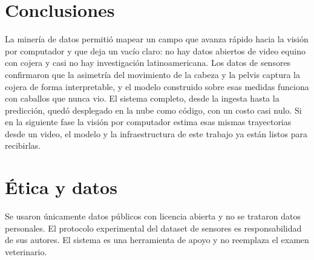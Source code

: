 \documentclass[conference,a4paper]{IEEEtran}
\begin{document}
\section{Conclusiones}
La minería de datos permitió mapear un campo que avanza rápido hacia la visión por computador y que deja un vacío claro: no hay datos abiertos de video equino con cojera y casi no hay investigación latinoamericana. Los datos de sensores confirmaron que la asimetría del movimiento de la cabeza y la pelvis captura la cojera de forma interpretable, y el modelo construido sobre esas medidas funciona con caballos que nunca vio. El sistema completo, desde la ingesta hasta la predicción, quedó desplegado en la nube como código, con un costo casi nulo. Si en la siguiente fase la visión por computador estima esas mismas trayectorias desde un video, el modelo y la infraestructura de este trabajo ya están listos para recibirlas.

\section*{Ética y datos}
Se usaron únicamente datos públicos con licencia abierta y no se trataron datos personales. El protocolo experimental del dataset de sensores es responsabilidad de sus autores. El sistema es una herramienta de apoyo y no reemplaza el examen veterinario.
\end{document}

